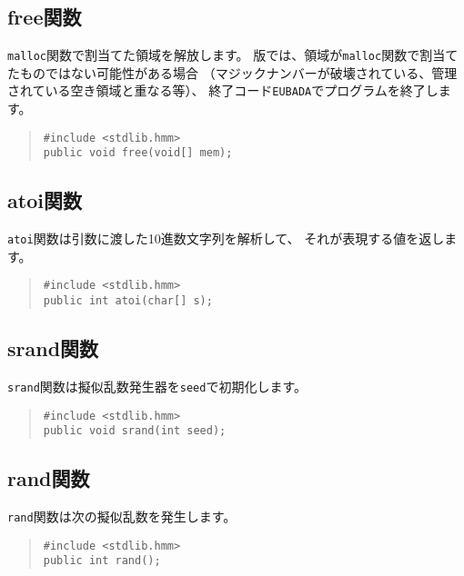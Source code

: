 \subsection{free関数}

\verb/malloc/関数で割当てた領域を解放します。
\tac 版では、領域が\verb/malloc/関数で割当てたものではない可能性がある場合
（マジックナンバーが破壊されている、管理されている空き領域と重なる等）、
終了コード\verb/EUBADA/でプログラムを終了します。

\begin{quote}
\begin{verbatim}
#include <stdlib.hmm>
public void free(void[] mem);
\end{verbatim}
\end{quote}

\subsection{atoi関数}

\verb/atoi/関数は引数に渡した10進数文字列を解析して、
それが表現する値を返します。

\begin{quote}
\begin{verbatim}
#include <stdlib.hmm>
public int atoi(char[] s);
\end{verbatim}
\end{quote}

\subsection{srand関数}

\verb/srand/関数は擬似乱数発生器を\verb/seed/で初期化します。

\begin{quote}
\begin{verbatim}
#include <stdlib.hmm>
public void srand(int seed);
\end{verbatim}
\end{quote}

\subsection{rand関数}

\verb/rand/関数は次の擬似乱数を発生します。

\begin{quote}
\begin{verbatim}
#include <stdlib.hmm>
public int rand();
\end{verbatim}
\end{quote}

